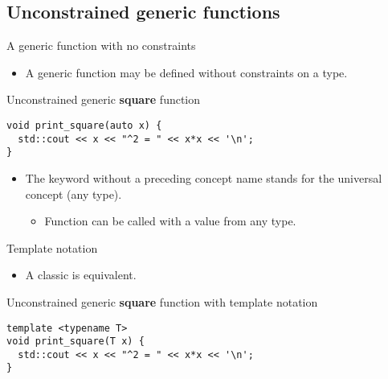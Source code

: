 \subsection{Unconstrained generic functions}

\begin{frame}[t,fragile]{A generic function with no constraints}
\begin{itemize}
  \item A generic function may be defined without constraints on
        a type.
\end{itemize}

\begin{block}{Unconstrained generic \textbf{square} function}
\begin{lstlisting}
void print_square(auto x) {
  std::cout << x << "^2 = " << x*x << '\n';
}
\end{lstlisting}
\end{block}

\begin{itemize}
  \item The keyword  without a preceding concept name
        stands for the universal concept (any type).
    \begin{itemize}
      \item Function can be called with a value from any type.
    \end{itemize}
\end{itemize}
\end{frame}

\begin{frame}[t,fragile]{Template notation}
\begin{itemize}
  \item A classic  is equivalent.
\end{itemize}

\begin{block}{Unconstrained generic \textbf{square} function with template notation}
\begin{lstlisting}
template <typename T>
void print_square(T x) {
  std::cout << x << "^2 = " << x*x << '\n';
}
\end{lstlisting}
\end{block}
\end{frame}


